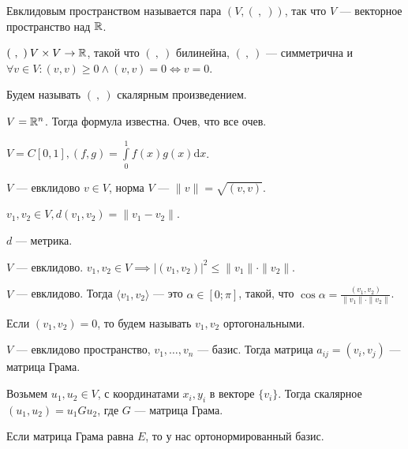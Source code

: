 \begin{definition}
    Евклидовым пространством называется пара $(V, (\ ,\ ))$, так что $V$ --- векторное пространство над  $\mathbb{R}$.

    $(\ ,\ )\: V \times V \to \mathbb{R}$, такой что  $(\ ,\ )$ билинейна,  $(\ ,\ )$ --- симметрична и  $\forall v \in V\!: (v, v) \ge 0 \land (v, v) = 0 \iff v = 0$.

    Будем называть $(\ ,\ )$ скалярным произведением.
\end{definition}
\begin{example}
    $V=\mathbb{R}^n$. Тогда формула известна. Очев, что все очев.
\end{example}
\begin{example}
    $V = C[0, 1], (f, g) = \int\limits_0^{1}f(x)g(x) \mathrm{d}x$.
\end{example}
\begin{definition}
    $V$ --- евклидово  $v \in V$, норма  $V$ --- $\|v\| = \sqrt{(v, v)}$.

     $v_1, v_2 \in V, d(v_1, v_2) = \|v_1 - v_2\|$.
\end{definition}
\begin{statement}
    $d$ --- метрика.
\end{statement}
\begin{statement}
    $V$ --- евклидово. $v_1, v_2 \in V \implies |(v_1,v_2)|^2 \le \|v_1\| \cdot \|v_2\|$.
\end{statement}
\begin{definition}
    $V$ --- евклидово. Тогда  $\langle v_1, v_2 \rangle$ --- это $\alpha \in [0; \pi]$,  такой, что  $\cos \alpha = \frac{(v_1, v_2)}{\|v_1\| \cdot \|v_2\|}$. 
\end{definition}
\begin{definition}
    Если $(v_1, v_2) = 0$, то будем называть $v_1, v_2$ ортогональными.
\end{definition}
\begin{definition}
    $V$ --- евклидово пространство,  $v_1, \ldots, v_n$ --- базис. Тогда матрица $a_{ij} = (v_i, v_j)$ --- матрица Грама.
\end{definition}

Возьмем $u_1, u_2 \in V$, с координатами $x_i, y_i$ в векторе  $\{v_i\}$. Тогда скалярное  $(u_1, u_2) = u_1Gu_2$, где $G$ --- матрица Грама.

Если матрица Грама равна  $E$, то у нас ортонормированный базис.

